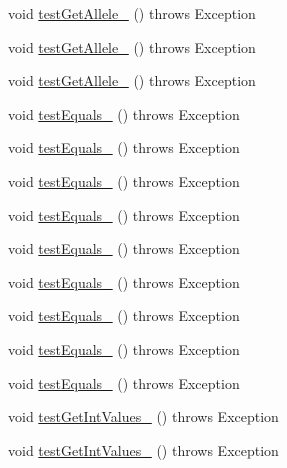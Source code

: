 \begin{DoxyCompactItemize}
\item 
void \hyperlink{classorg_1_1jgap_1_1impl_1_1_fixed_binary_gene_test_a950619d64e13dc4e4b8cf0f5352232ef}{test\-Get\-Allele\-\_} ()  throws Exception 
\item 
void \hyperlink{classorg_1_1jgap_1_1impl_1_1_fixed_binary_gene_test_a5b375d79277555d652143c4c7eb9c231}{test\-Get\-Allele\-\_} ()  throws Exception 
\item 
void \hyperlink{classorg_1_1jgap_1_1impl_1_1_fixed_binary_gene_test_a29d39330c076e729ea75ee87a178fc60}{test\-Get\-Allele\-\_} ()  throws Exception 
\item 
void \hyperlink{classorg_1_1jgap_1_1impl_1_1_fixed_binary_gene_test_a8da88a70250c243c804e9039aeb0c2a9}{test\-Equals\-\_} ()  throws Exception 
\item 
void \hyperlink{classorg_1_1jgap_1_1impl_1_1_fixed_binary_gene_test_aadb44d85f751acf0a744a721c465dee7}{test\-Equals\-\_} ()  throws Exception 
\item 
void \hyperlink{classorg_1_1jgap_1_1impl_1_1_fixed_binary_gene_test_aabd3acc80c5acf32053651d5b4b80317}{test\-Equals\-\_} ()  throws Exception 
\item 
void \hyperlink{classorg_1_1jgap_1_1impl_1_1_fixed_binary_gene_test_a06849877513df425eac44ed43c023d08}{test\-Equals\-\_} ()  throws Exception 
\item 
void \hyperlink{classorg_1_1jgap_1_1impl_1_1_fixed_binary_gene_test_a95711f8b51ccb129f71e543fef2a0dc6}{test\-Equals\-\_} ()  throws Exception 
\item 
void \hyperlink{classorg_1_1jgap_1_1impl_1_1_fixed_binary_gene_test_ab4617abb6c510c03f54194dfac7c7033}{test\-Equals\-\_} ()  throws Exception 
\item 
void \hyperlink{classorg_1_1jgap_1_1impl_1_1_fixed_binary_gene_test_ad09364706161b62d17706a27706ab1a5}{test\-Equals\-\_} ()  throws Exception 
\item 
void \hyperlink{classorg_1_1jgap_1_1impl_1_1_fixed_binary_gene_test_a2bcc8dbc18f30be1a4c541b3ecd4304a}{test\-Equals\-\_} ()  throws Exception 
\item 
void \hyperlink{classorg_1_1jgap_1_1impl_1_1_fixed_binary_gene_test_ac5d4b52ef54182fb2ef4031556a0491e}{test\-Equals\-\_} ()  throws Exception 
\item 
void \hyperlink{classorg_1_1jgap_1_1impl_1_1_fixed_binary_gene_test_a6a6b9e542a400c7d339da008381cb67e}{test\-Get\-Int\-Values\-\_} ()  throws Exception 
\item 
void \hyperlink{classorg_1_1jgap_1_1impl_1_1_fixed_binary_gene_test_a0bc8fd702ae57f23cefa9c339e894d9d}{test\-Get\-Int\-Values\-\_} ()  throws Exception 

\end{DoxyCompactItemize}
